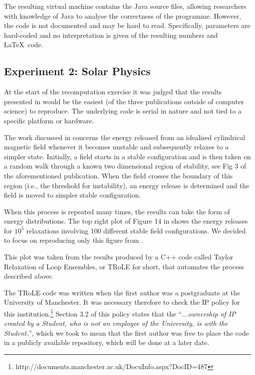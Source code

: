 The resulting virtual machine contains the Java source files, allowing researchers with knowledge of Java to analyse the correctness of the programme. However, the code is not documented and may be hard to read. Specifically, parameters are hard-coded and no interpretation is given of the resulting numbers and \LaTeX\ code.

\subsection*{Experiment 2: Solar Physics}

At the start of the recomputation exercise it was judged that the results presented in \cite{bareford2010nanoflare}
would be the easiest (of the three publications outside of computer science) to reproduce. The underlying
code is serial in nature and not tied to a specific platform or hardware. 

The work discussed in \cite{bareford2010nanoflare} concerns the energy released from an idealised cylindrical magnetic
field whenever it becomes unstable and subsequently relaxes to a simpler state. Initially, a field starts in a
stable configuration and is then taken on a random walk through a known two dimensional region of stability, see Fig 3 of
the aforementioned publication. When the field crosses the boundary of this region (i.e., the threshold for instability),
an energy release is determined and the field is moved to simpler stable configuration. 

When this process is repeated many times, the results can take the form of energy distributions. The top right plot
of Figure 14 in \cite{bareford2010nanoflare} shows the energy releases for $10^5$ relaxations involving 100 different stable field
configurations. We decided to focus on reproducing only this figure from \cite{bareford2010nanoflare}.

This plot was taken from the results produced by a C++ code called Taylor Relaxation of Loop Ensembles, or TRoLE
for short, that automates the process described above.

The TRoLE code was written when the first author was a postgraduate at the University of Manchester. It was
necessary therefore to check the IP policy for this institution.\footnote{http://documents.manchester.ac.uk/DocuInfo.aspx?DocID=487} Section 3.2 of this policy states that the ``\emph{...ownership
of IP created by a Student, who is not an employee of the University, is with the Student.}'', which we took to mean
that the first author was free to place the code in a publicly available repository, which will be done at a later date.

